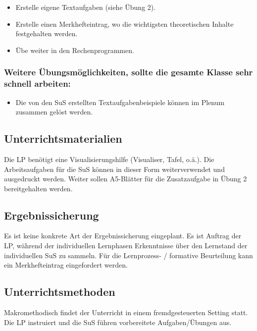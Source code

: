 \documentclass[
  10pt,
  a4paper,
  DIV=11]{scrartcl}
\providecommand{\tightlist}{%
  \setlength{\itemsep}{0pt}\setlength{\parskip}{0pt}}\usepackage{longtable,booktabs,array}
\begin{document}
\begin{itemize}
\tightlist
\item
  Erstelle eigene Textaufgaben (siehe Übung 2).
\item
  Erstelle einen Merkhefteintrag, wo die wichtigsten theoretischen
  Inhalte festgehalten werden.
\item
  Übe weiter in den Rechenprogrammen.
\end{itemize}

\subsubsection{Weitere Übungsmöglichkeiten, sollte die gesamte Klasse
sehr schnell
arbeiten:}\label{weitere-uxfcbungsmuxf6glichkeiten-sollte-die-gesamte-klasse-sehr-schnell-arbeiten}

\begin{itemize}
\tightlist
\item
  Die von den SuS erstellten Textaufgabenbeispiele können im Plenum
  zusammen gelöst werden.
\end{itemize}

\subsection{Unterrichtsmaterialien}\label{unterrichtsmaterialien}

Die LP benötigt eine Visualisierungshilfe (Visualiser, Tafel, o.ä.). Die
Arbeitsaufgaben für die SuS können in dieser Form weiterverwendet und
ausgedruckt werden. Weiter sollen A5-Blätter für die Zusatzaufgabe in
Übung 2 bereitgehalten werden.

\subsection{Ergebnissicherung}\label{ergebnissicherung}

Es ist keine konkrete Art der Ergebnissicherung eingeplant. Es ist
Auftrag der LP, während der individuellen Lernphasen Erkenntnisse über
den Lernstand der individuellen SuS zu sammeln. Für die Lernprozess- /
formative Beurteilung kann ein Merkhefteintrag eingefordert werden.

\subsection{Unterrichtsmethoden}\label{unterrichtsmethoden}

Makromethodisch findet der Unterricht in einem fremdgesteuerten Setting
statt. Die LP instruiert und die SuS führen vorbereitete
Aufgaben/Übungen aus.
\end{document}
